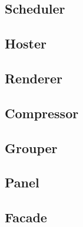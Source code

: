 \subsection{Scheduler}
\subsection{Hoster}
\subsection{Renderer}
\subsection{Compressor}
\subsection{Grouper}
\subsection{Panel}
\subsection{Facade}